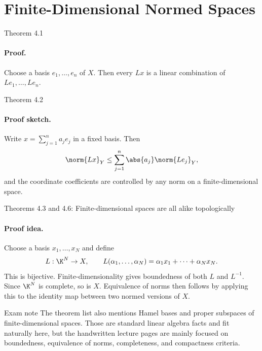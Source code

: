 \documentclass[11pt]{article}
\begin{document}
\section{Finite-Dimensional Normed Spaces}

\begin{thmbox}{Theorem 4.1}
\thmFiniteDimRange
\end{thmbox}

\paragraph{Proof.}
Choose a basis $e_1,\dots,e_n$ of $X$. Then every $Lx$ is a linear combination of $Le_1,\dots,Le_n$.

\begin{thmbox}{Theorem 4.2}
\thmFiniteDimBounded
\end{thmbox}

\paragraph{Proof sketch.}
Write $x=\sum_{j=1}^n a_je_j$ in a fixed basis. Then
\[
\norm{Lx}_Y\le \sum_{j=1}^n \abs{a_j}\norm{Le_j}_Y,
\]
and the coordinate coefficients are controlled by any norm on a finite-dimensional space.

\begin{thmbox}{Theorems 4.3 and 4.6: Finite-dimensional spaces are all alike topologically}
\thmFiniteDimProperties
\end{thmbox}

\paragraph{Proof idea.}
Choose a basis $x_1,\dots,x_N$ and define
\[
L:\K^N\to X,
\qquad
L(\alpha_1,\dots,\alpha_N)=\alpha_1x_1+\cdots+\alpha_Nx_N.
\]
This is bijective. Finite-dimensionality gives boundedness of both $L$ and $L^{-1}$. Since $\K^N$ is complete, so is $X$. Equivalence of norms then follows by applying this to the identity map between two normed versions of $X$.

\begin{warningbox}{Exam note}
The theorem list also mentions Hamel bases and proper subspaces of finite-dimensional spaces. Those are standard linear algebra facts and fit naturally here, but the handwritten lecture pages are mainly focused on boundedness, equivalence of norms, completeness, and compactness criteria.
\end{warningbox}
\end{document}
